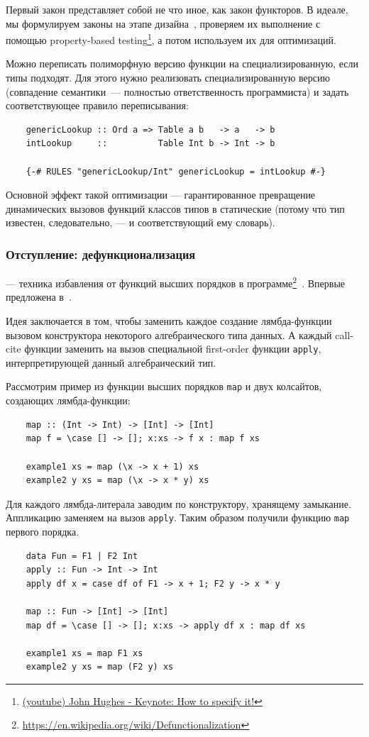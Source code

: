 Первый закон представляет собой не что иное, как закон функторов.
В идеале, мы формулируем законы на этапе дизайна~\cite{maguire-algebra}, проверяем их выполнение с помощью property-based testing\footnote{\href{https://youtu.be/G0NUOst-53U?si=vdcKVUi9vSPBY0Jz}{(youtube) John Hughes - Keynote: How to specify it!}}, а потом используем их для оптимизаций.

Можно переписать полиморфную версию функции на специализированную, если типы подходят.
Для этого нужно реализовать специализированную версию (совпадение семантики~--- полностью ответственность программиста) и задать соответствующее правило переписывания:
\begin{verbatim}
    genericLookup :: Ord a => Table a b   -> a   -> b
    intLookup     ::          Table Int b -> Int -> b

    {-# RULES "genericLookup/Int" genericLookup = intLookup #-}
\end{verbatim}

Основной эффект такой оптимизации --- гарантированное превращение динамических вызовов функций классов типов в статические (потому что тип известен, следовательно, --- и соответствующий ему словарь).

\subsubsection{Отступление: дефункционализация} \label{subsubsec:defunctionalization}

 --- техника избавления от функций высших порядков в программе\footnote{\url{https://en.wikipedia.org/wiki/Defunctionalization}}~\cite{defunctionalization-slides}.
Впервые предложена в~\cite{reynolds1972definitional, reynolds1998definitional}.

Идея заключается в том, чтобы заменить каждое создание лямбда-функции вызовом конструктора некоторого алгебраического типа данных.
А каждый call-cite функции заменить на вызов специальной first-order функции \texttt{apply}, интерпретирующей данный алгебраический тип.

Рассмотрим пример из функции высших порядков \texttt{map} и двух колсайтов, создающих лямбда-функции:
\begin{verbatim}
    map :: (Int -> Int) -> [Int] -> [Int]
    map f = \case [] -> []; x:xs -> f x : map f xs

    example1 xs = map (\x -> x + 1) xs
    example2 y xs = map (\x -> x * y) xs
\end{verbatim}
Для каждого лямбда-литерала заводим по конструктору, хранящему замыкание.
Аппликацию заменяем на вызов \texttt{apply}.
Таким образом получили функцию \texttt{map} первого порядка.
\begin{verbatim}
    data Fun = F1 | F2 Int
    apply :: Fun -> Int -> Int
    apply df x = case df of F1 -> x + 1; F2 y -> x * y

    map :: Fun -> [Int] -> [Int]
    map df = \case [] -> []; x:xs -> apply df x : map df xs

    example1 xs = map F1 xs
    example2 y xs = map (F2 y) xs
\end{verbatim}

